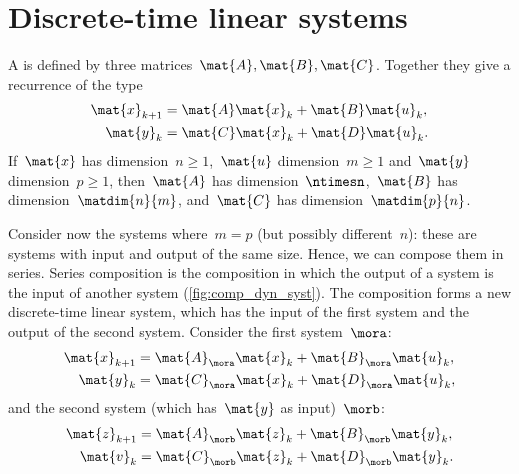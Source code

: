 
\section{Discrete-time linear systems}

\begin{definition}
    \label{def:discrete-time-linear-system}
    A  is defined by three matrices~$\mat{A},\mat{B},\mat{C}$.
    Together they give a recurrence of the type
    \begin{equation}
        \label{eq:linear-discrete-time-dynamics}
        \begin{aligned}
            \mat{x}_{k+1} & = \mat{A} \mat{x}_k + \mat{B} \mat{u}_k, \\
            \mat{y}_{k}   & = \mat{C} \mat{x}_k + \mat{D} \mat{u}_k.
        \end{aligned}
    \end{equation}
    If~$\mat{x}$ has dimension~$n\geq1$,~$\mat{u}$ dimension~$m\geq1$ and~$\mat{y}$ dimension~$p\geq1$, then~$\mat{A}$ has dimension~$\ntimesn$,~$\mat{B}$ has dimension~$\matdim{n}{m}$, and~$\mat{C}$ has dimension~$\matdim{p}{n}$.
\end{definition}

\begin{marginfigure}
    \centering
    \caption{Composition of discrete-time linear systems.}
    \label{fig:comp_dyn_syst}
\end{marginfigure}

Consider now the systems where~$m=p$ (but possibly different~$n$):
these are systems with input and output of the same size.
Hence, we can compose them in series.
Series composition is the composition in which the output of a system is the input of another system (\cref{fig:comp_dyn_syst}).
The composition forms a new discrete-time linear system, which has the input of the first system and the output of the second system.
Consider the first system~$\mora$:
%
\begin{equation}
    \label{eq:dlin-1}
    \begin{aligned}
        \mat{x}_{k+1} & = \mat{A}_\mora \mat{x}_k + \mat{B}_\mora \mat{u}_k, \\
        \mat{y}_{k}   & = \mat{C}_\mora \mat{x}_k + \mat{D}_\mora \mat{u}_k,
    \end{aligned}
\end{equation}
%
and the second system (which has~$\mat{y}$ as input)~$\morb$:
%
\begin{equation}
    \label{eq:dlin-2}
    \begin{aligned}
        \mat{z}_{k+1} & = \mat{A}_\morb \mat{z}_k + \mat{B}_\morb \mat{y}_k, \\
        \mat{v}_{k}   & = \mat{C}_\morb \mat{z}_k+ \mat{D}_\morb \mat{y}_k.
    \end{aligned}
\end{equation}

